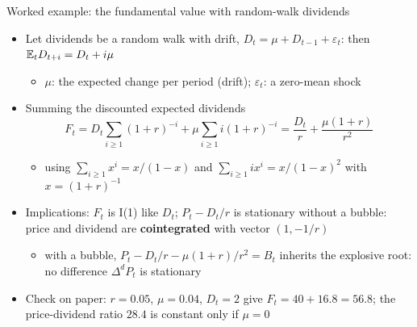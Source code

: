 \begin{frame}{Worked example: the fundamental value with random-walk dividends}
\itemsize{\small}
\begin{itemize}
    \item Let dividends be a random walk with drift, $D_t = \mu + D_{t-1} + \varepsilon_t$: then $\mathbb{E}_t D_{t+i} = D_t + i\mu$
    \begin{itemize}
        \item $\mu$: the expected change per period (drift); $\varepsilon_t$: a zero-mean shock
    \end{itemize}
    \item Summing the discounted expected dividends \[ F_t = D_t\sum_{i \ge 1}(1 + r)^{-i} + \mu\sum_{i \ge 1} i(1 + r)^{-i} = \dfrac{D_t}{r} + \dfrac{\mu(1 + r)}{r^2} \]
    \begin{itemize}
        \item using $\sum_{i \ge 1} x^i = x/(1 - x)$ and $\sum_{i \ge 1} i x^i = x/(1 - x)^2$ with $x = (1 + r)^{-1}$
    \end{itemize}
    \item Implications: $F_t$ is I(1) like $D_t$; $P_t - D_t/r$ is stationary without a bubble: price and dividend are \textbf{cointegrated} with vector $(1, -1/r)$ 
    \begin{itemize}
        \item with a bubble, $P_t - D_t/r - \mu(1 + r)/r^2 = B_t$ inherits the explosive root: no difference $\Delta^d P_t$ is stationary 
    \end{itemize}
    \item Check on paper: $r = 0.05$, $\mu = 0.04$, $D_t = 2$ give $F_t = 40 + 16.8 = 56.8$; the price-dividend ratio $28.4$ is constant only if $\mu = 0$
\end{itemize}
\end{frame}

